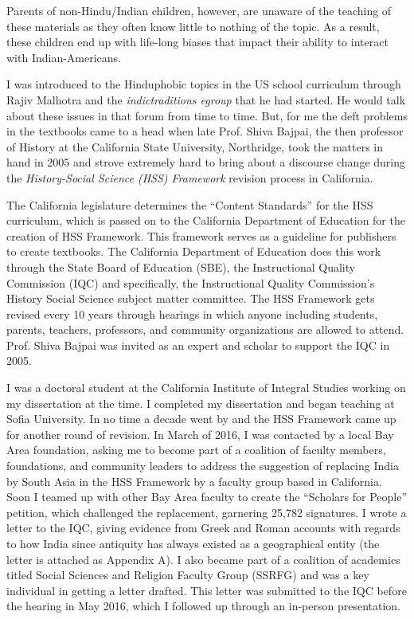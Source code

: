 Parents of non-Hindu/Indian children, however, are unaware of the teaching of these materials as they often know little to nothing of the topic. As a result, these children end up with life-long biases that impact their ability to interact with Indian-Americans.

I was introduced to the Hinduphobic topics in the US school curriculum through Rajiv Malhotra and the \textit{indictraditions egroup} that he had started. He would talk about these issues in that forum from time to time. But, for me the deft problems in the textbooks came to a head when late Prof. Shiva Bajpai, the then professor of History at the California State University, Northridge, took the matters in hand in 2005 and strove extremely hard to bring about a discourse change during the \textit{History-Social Science (HSS) Framework} revision process in California. 

The California legislature determines the “Content Standards” for the HSS curriculum, which is passed on to the California Department of Education for the creation of HSS Framework. This framework serves as a guideline for publishers to create textbooks. The California Department of Education does this work through the State Board of Education (SBE), the Instructional Quality Commission (IQC) and specifically, the Instructional Quality Commission’s History Social Science subject matter committee. The HSS Framework gets revised every 10 years through hearings in which anyone including students, parents, teachers, professors, and community organizations are allowed to attend. Prof. Shiva Bajpai was invited as an expert and scholar to support the IQC in 2005. 

I was a doctoral student at the California Institute of Integral Studies working on my dissertation at the time. I completed my dissertation and began teaching at Sofia University. In no time a decade went by and the HSS Framework came up for another round of revision. In March of 2016, I was contacted by a local Bay Area foundation, asking me to become part of a coalition of faculty members, foundations, and community leaders to address the suggestion of replacing India by South Asia in the HSS Framework by a faculty group based in California. Soon I teamed up with other Bay Area faculty to create the “Scholars for People” petition, which challenged the replacement, garnering 25,782 signatures. I wrote a letter to the IQC, giving evidence from Greek and Roman accounts with regards to how India since antiquity has always existed as a geographical entity (the letter is attached as Appendix A). I also became part of a coalition of academics titled Social Sciences and Religion Faculty Group (SSRFG) and was a key individual in getting a letter drafted. This letter was submitted to the IQC before the hearing in May 2016, which I followed up through an in-person presentation. 

